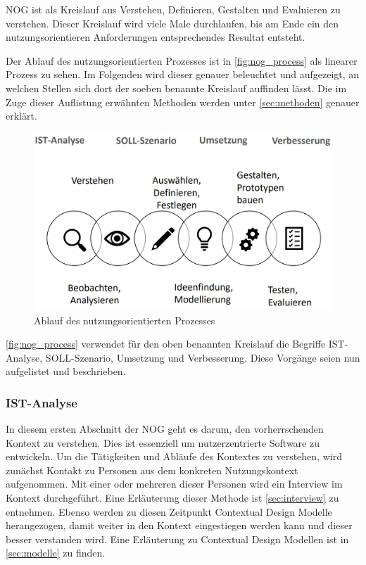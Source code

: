 NOG ist als Kreislauf aus Verstehen, Definieren, Gestalten und Evaluieren zu verstehen.
Dieser Kreislauf wird viele Male durchlaufen, bis am Ende ein den nutzungsorientieren Anforderungen entsprechendes Resultat entsteht.

Der Ablauf des nutzungsorientierten Prozesses ist in \autoref{fig:nog_process} als linearer Prozess zu sehen.
Im Folgenden wird dieser genauer beleuchtet und aufgezeigt, an welchen Stellen sich dort der soeben benannte Kreislauf auffinden lässt.
Die im Zuge dieser Auflistung erwähnten Methoden werden unter \autoref{sec:methoden} genauer erklärt.

\begin{figure}[htp]
    \centering
    \includegraphics[width=1\textwidth]{images/NOG_Prozess.png}
    \caption{Ablauf des nutzungsorientierten Prozesses}
    \label{fig:nog_process}
\end{figure}

\autoref{fig:nog_process} verwendet für den oben benannten Kreislauf die Begriffe IST-Analyse, SOLL-Szenario, Umsetzung und Verbesserung. 
Diese Vorgänge seien nun aufgelistet und beschrieben.

\subsubsection{IST-Analyse}

In diesem ersten Abschnitt der NOG geht es darum, den vorherrschenden Kontext zu verstehen.
Dies ist essenziell um nutzerzentrierte Software zu entwickeln.
Um die Tätigkeiten und Abläufe des Kontextes zu verstehen, wird zunächst Kontakt zu Personen aus dem konkreten Nutzungskontext aufgenommen.
Mit einer oder mehreren dieser Personen wird ein Interview im Kontext durchgeführt.
Eine Erläuterung dieser Methode ist \autoref{sec:interview} zu entnehmen.
Ebenso werden zu diesen Zeitpunkt Contextual Design Modelle herangezogen, damit weiter in den Kontext eingestiegen werden kann und dieser besser verstanden wird.
Eine Erläuterung zu Contextual Design Modellen ist in \autoref{sec:modelle} zu finden.

